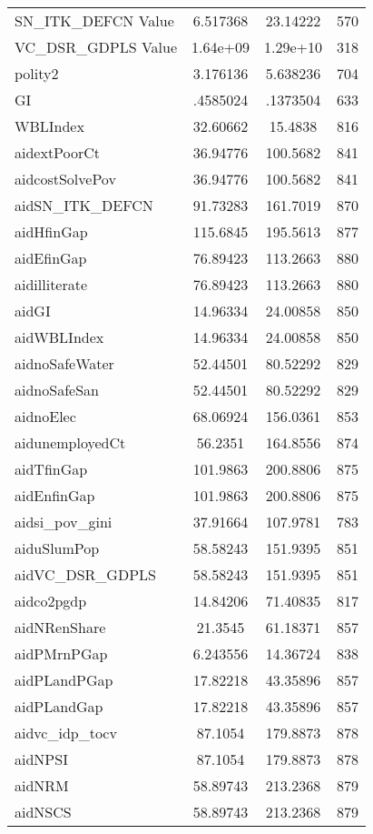 {\begin{tabular}{l*{1}{ccc}}
SN\_ITK\_DEFCN Value  &    6.517368&    23.14222&         570\\
VC\_DSR\_GDPLS Value  &    1.64e+09&    1.29e+10&         318\\
polity2             &    3.176136&    5.638236&         704\\
GI                  &    .4585024&    .1373504&         633\\
WBLIndex            &    32.60662&     15.4838&         816\\
aidextPoorCt        &    36.94776&    100.5682&         841\\
aidcostSolvePov     &    36.94776&    100.5682&         841\\
aidSN\_ITK\_DEFCN     &    91.73283&    161.7019&         870\\
aidHfinGap          &    115.6845&    195.5613&         877\\
aidEfinGap          &    76.89423&    113.2663&         880\\
aidilliterate       &    76.89423&    113.2663&         880\\
aidGI               &    14.96334&    24.00858&         850\\
aidWBLIndex         &    14.96334&    24.00858&         850\\
aidnoSafeWater      &    52.44501&    80.52292&         829\\
aidnoSafeSan        &    52.44501&    80.52292&         829\\
aidnoElec           &    68.06924&    156.0361&         853\\
aidunemployedCt     &     56.2351&    164.8556&         874\\
aidTfinGap          &    101.9863&    200.8806&         875\\
aidEnfinGap         &    101.9863&    200.8806&         875\\
aidsi\_pov\_gini      &    37.91664&    107.9781&         783\\
aiduSlumPop         &    58.58243&    151.9395&         851\\
aidVC\_DSR\_GDPLS     &    58.58243&    151.9395&         851\\
aidco2pgdp          &    14.84206&    71.40835&         817\\
aidNRenShare        &     21.3545&    61.18371&         857\\
aidPMrnPGap         &    6.243556&    14.36724&         838\\
aidPLandPGap        &    17.82218&    43.35896&         857\\
aidPLandGap         &    17.82218&    43.35896&         857\\
aidvc\_idp\_tocv      &     87.1054&    179.8873&         878\\
aidNPSI             &     87.1054&    179.8873&         878\\
aidNRM              &    58.89743&    213.2368&         879\\
aidNSCS             &    58.89743&    213.2368&         879\\
\hline\hline
\end{tabular}
}
